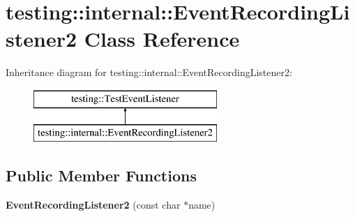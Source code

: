\hypertarget{classtesting_1_1internal_1_1EventRecordingListener2}{}\section{testing\+:\+:internal\+:\+:Event\+Recording\+Listener2 Class Reference}
\label{classtesting_1_1internal_1_1EventRecordingListener2}
Inheritance diagram for testing\+:\+:internal\+:\+:Event\+Recording\+Listener2\+:\begin{figure}[H]
\begin{center}
\leavevmode
\includegraphics[height=2.000000cm]{classtesting_1_1internal_1_1EventRecordingListener2}
\end{center}
\end{figure}
\subsection*{Public Member Functions}
\begin{DoxyCompactItemize}
\item 
\mbox{\label{classtesting_1_1internal_1_1EventRecordingListener2_a59b5e3d73b6ebb26e06dd28084ad9f68}} 
{\bfseries Event\+Recording\+Listener2} (const char $\ast$name)
\end{DoxyCompactItemize}
